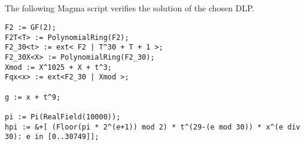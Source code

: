 \documentclass[11pt]{llncs}
\begin{document}
\begin{subappendices}

\section{}\label{app:B}

The following Magma script verifies the solution of the chosen DLP.

{\scriptsize
\begin{verbatim}
F2 := GF(2);
F2T<T> := PolynomialRing(F2);
F2_30<t> := ext< F2 | T^30 + T + 1 >;
F2_30X<X> := PolynomialRing(F2_30);
Xmod := X^1025 + X + t^3;
Fqx<x> := ext<F2_30 | Xmod >;

g := x + t^9;

pi := Pi(RealField(10000));
hpi := &+[ (Floor(pi * 2^(e+1)) mod 2) * t^(29-(e mod 30)) * x^(e div 30): e in [0..30749]];


\end{verbatim}}
\end{subappendices}
\end{document}
